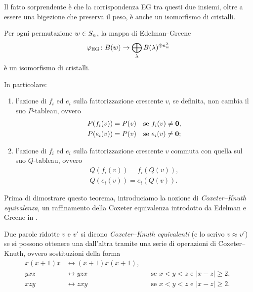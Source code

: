 Il fatto sorprendente \`e che la corrispondenza EG tra questi due insiemi, oltre a
essere una bigezione che preserva il peso, \`e anche un isomorfismo di cristalli.

\begin{theorem}
    {\cite[Theorem~4.11]{morse-schilling-15}}
    \label{thm:eg_isomorfismo}
    Per ogni permutazione $w \in S_n$, la mappa di Edelman--Greene
    \[
        \varphi_{\mathrm{EG}} \colon 
        B(w) \to 
        \bigoplus_\lambda B(\lambda)^{\oplus a_w^\lambda}
    \]
    \`e un isomorfismo di cristalli.

    In particolare:
    \begin{enumerate}
        \item \label{item:thm_pt1}
            l'azione di $f_i$ ed $e_i$ sulla fattorizzazione crescente $v$, se definita,
            non cambia il suo $P$-tableau, ovvero
            \begin{align*}
                P(f_i(v)) &= P(v) && \text{se $f_i(v) \neq \mathbf{0}$,} \\
                P(e_i(v)) &= P(v) && \text{se $e_i(v) \neq \mathbf{0}$;}
            \end{align*}
        \item \label{item:thm_pt2}
            l'azione di $f_i$ ed $e_i$ sulla fattorizzazione crescente $v$ commuta
            con quella sul suo $Q$-tableau, ovvero
            \begin{align*}
                Q(f_i(v)) = f_i(Q(v)), \\
                Q(e_i(v)) = e_i(Q(v)).
            \end{align*}
    \end{enumerate}





\end{theorem}

Prima di dimostrare questo teorema, introduciamo la nozione di
\emph{Coxeter--Knuth equivalenza}, un raffinamento della Coxeter equivalenza introdotto
da Edelman e Greene in \cite[Definition~6.19]{edelman-greene-87}.

\begin{definition}
    Due parole ridotte $v$ e $v'$ si dicono \emph{Coxeter--Knuth equivalenti}
    (e lo scrivo $v \approx v'$) se si possono ottenere
    una dall'altra tramite una serie di operazioni di Coxeter--Knuth, ovvero
    sostituzioni della forma
    \begin{subequations}
        \begin{align}
            \label{subeq:ck_braid}
            x(x+1)x &\leftrightarrow (x+1)x(x+1),  \\
            \label{subeq:ck_sx}
            y x z  &\leftrightarrow y z x  && \text{se $x<y<z$ e $\lvert x-z \rvert \geq 2$, } \\
            \label{subeq:ck_dx}
            x z y  &\leftrightarrow z x y  && \text{se $x<y<z$ e $\lvert x-z \rvert \geq 2$. }
        \end{align}
    \end{subequations}
\end{definition}

